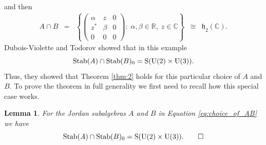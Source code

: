\documentclass{article}
\theoremstyle{plain}
\newtheorem{lem}[thm]{Lemma}
\theoremstyle{remark}
\theoremstyle{definition}
\newcommand{\R}{{\mathbb R}}  %
\newcommand{\C}{{\mathbb C}}  %
\newcommand{\U}{{\rm U}}    %
\newcommand{\Stab}{\mathrm{Stab}} %
\renewcommand{\S}{\mathrm{S}} %
\newcommand{\h}{\mathfrak{h}}  %
\begin{document}
and then
\[  \begin{array}{cclccc}
  A \cap B &=& \left\{  \left( \begin{array}{ccc}  
                         \alpha  &  z  & 0    \\  
                         z^*       & \beta & 0      \\ 
                         0    & 0   & 0   
\end{array} \right) : \; \alpha,\beta \in \R, \; z \in \C \right\} &\cong& \h_2(\C).
\end{array}
\]
Dubois-Violette and Todorov showed that in this example
\[     \Stab(A) \cap \Stab(B)_0 = \S(\U(2) \times \U(3)) .\]
Thus, they showed that Theorem \ref{thm:2} holds for this particular choice of $A$ and $B$.  To prove the theorem in full generality we first need to recall how this special case works.

\begin{lem}
\label{lem:thm:2_special_case}
For the Jordan subalgebras $A$ and $B$ in Equation \eqref{eq:choice_of_AB} we have
\[     \Stab(A) \cap \Stab(B)_0 = \S(\U(2) \times \U(3)). \qedhere \]
\end{lem}
\end{document}
